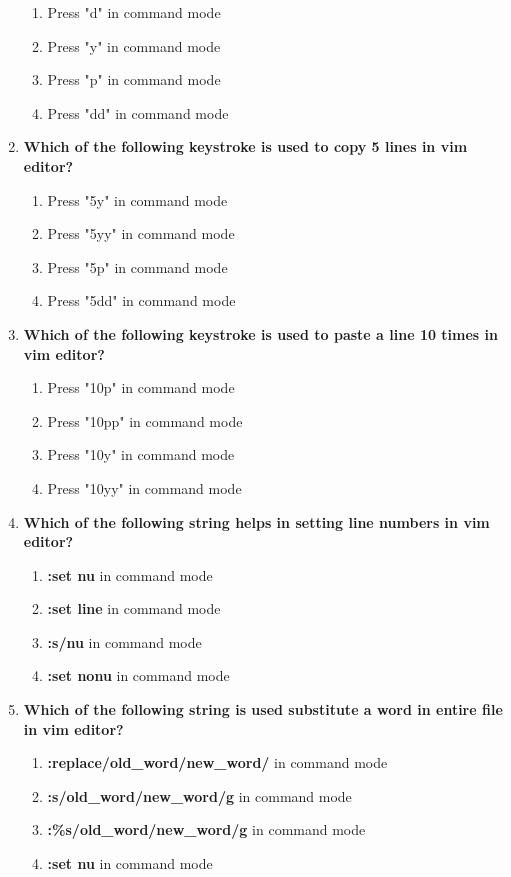\begin{flushleft}
\begin{enumerate}
\begin{enumerate}[label=(\alph*)]
			\item Press "d" in command mode      
			\item Press "y" in command mode      
			\item Press "p" in command mode      
			\item Press "dd" in command mode        %
		\end{enumerate}
		\bigskip
		\bigskip
		\item \textbf{Which of the following keystroke is used to copy 5 lines in vim editor?}
		\begin{enumerate}[label=(\alph*)]
			\item Press "5y" in command mode      
			\item Press "5yy" in command mode        %
			\item Press "5p" in command mode      
			\item Press "5dd" in command mode     
		\end{enumerate}	
		\bigskip
		\bigskip
		\item \textbf{Which of the following keystroke is used to paste a line 10 times in vim editor?}
		\begin{enumerate}[label=(\alph*)]
			\item Press "10p" in command mode      
			\item Press "10pp" in command mode        %
			\item Press "10y" in command mode      
			\item Press "10yy" in command mode     
		\end{enumerate}	
		\bigskip
		\bigskip
		\item \textbf{Which of the following string helps in setting line numbers in vim editor?}
		\begin{enumerate}[label=(\alph*)]
			\item \textbf{:set nu} in command mode   %
			\item \textbf{:set line} in command mode   
			\item \textbf{:s/nu} in command mode  
			\item \textbf{:set nonu} in command mode  
		\end{enumerate}
		\bigskip
		\bigskip
		\item \textbf{Which of the following string is used substitute a word in entire file in vim editor?}
		\begin{enumerate}[label=(\alph*)]
			\item \textbf{:replace/old\_word/new\_word/} in command mode   
			\item \textbf{:s/old\_word/new\_word/g} in command mode 
			\item \textbf{:\%s/old\_word/new\_word/g} in command mode    %
			\item \textbf{:set nu} in command mode  
		\end{enumerate}
	\end{enumerate}
	
	
\end{flushleft}
\newpage


